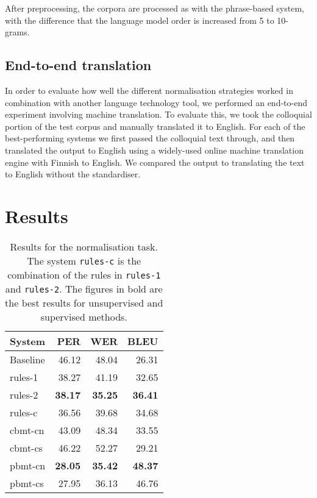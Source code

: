 \documentclass[11pt]{article}
\begin{document}
After preprocessing, the corpora are processed as with the phrase-based system, with the difference that the language model order is increased from 5 to 10-grams.

\subsection{End-to-end translation}

In order to evaluate how well the different normalisation strategies worked in 
combination with another language technology tool, we performed an end-to-end experiment
involving machine translation.
To evaluate this, we took the colloquial portion of the test corpus and manually 
translated it to English. For each of the best-performing systems we first passed
the colloquial text through, and then translated the output to English using
a widely-used online machine translation engine with Finnish to English. We compared
the output to translating the text to English without the standardiser. 

\section{Results}

\begin{table}
  \centering
  \begin{tabular}{|l|r|r|r|}
     \hline
    \textbf{System} & \textbf{PER} & \textbf{WER} & \textbf{BLEU} \\
     \hline
     Baseline & 46.12 & 48.04 & 26.31 \\
     \hline
     rules-1 & 38.27 & 41.19 & 32.65 \\
     rules-2 & \textbf{38.17} & \textbf{35.25} & \textbf{36.41} \\
     rules-c & 36.56 & 39.68 & 34.68 \\
     \hline
     {\sc cbmt}-cn & 43.09 & 48.34 & 33.55 \\
     {\sc cbmt}-cs & 46.22 & 52.27 & 29.21 \\
     {\sc pbmt}-cn & \textbf{28.05} & \textbf{35.42} & \textbf{48.37} \\
     {\sc pbmt}-cs & 27.95 & 36.13 & 46.76 \\
     \hline
  \end{tabular}
  \caption{Results for the normalisation task. The system \texttt{rules-c} is the combination
     of the rules in \texttt{rules-1} and \texttt{rules-2}. The figures in bold are the 
     best results for unsupervised and supervised methods.}
  \label{table:results-norm}
\end{table}
\end{document}
